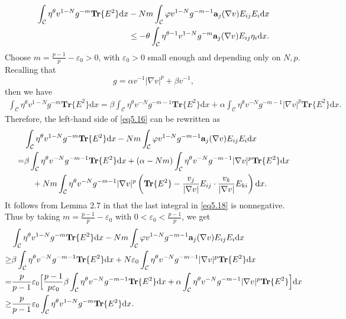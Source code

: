 \documentclass[12pt]{amsart}
\theoremstyle{definition}
\theoremstyle{remark}
\theoremstyle{conclusion}
\theoremstyle{conjecture}
\numberwithin{equation}{section}
\begin{document}
\begin{equation}\label{eq5.16}
\begin{split}
\int_{\mathcal{C}}\eta^\theta v^{1-N}g^{-m} \mathbf{Tr}\{E^2\}\mathrm{d}x &-Nm\int_{\mathcal{C}}\varphi v^{1-N}g^{-m-1}{\bf{a}}_j(\nabla v)E_{ij}E_i\mathrm{d}x\\
&\leq -\theta\int_{\mathcal{C}} \eta^{\theta-1} v^{1-N}g^{-m}{\bf{a}}_j(\nabla v)E_{ij}\eta_i \mathrm{d}x.
\end{split}
\end{equation}
Choose $m=\frac{p-1}{p}-\varepsilon_0>0$, with $\varepsilon_0>0$ small enough and depending only on $N,p$.
Recalling that
 $$g=\alpha v^{-1}|\nabla v|^p +\beta v^{-1},$$
 then we have
\begin{equation*}\label{eq5.17}
\begin{split}
\int_{\mathcal{C}}\eta^\theta v^{1-N}g^{-m} \mathbf{Tr}\{E^2\}\mathrm{d}x
        = \beta\int_{\mathcal{C}}\eta^\theta v^{-N}g^{-m-1}\mathbf{Tr}\{E^2\}\mathrm{d}x+\alpha\int_{\mathcal{C}}\eta^\theta v^{-N}g^{-m-1}|\nabla v|^p \mathbf{Tr}\{E^2\}\mathrm{d}x.
\end{split}
\end{equation*}
Therefore, the left-hand side of \eqref{eq5.16} can be rewritten as
\begin{equation}\label{eq5.18}
\begin{split}
\, &\int_{\mathcal{C}}\eta^\theta v^{1-N}g^{-m} \mathbf{Tr}\{E^2\}\mathrm{d}x-Nm\int_{\mathcal{C}}\varphi v^{1-N}g^{-m-1}{\bf{a}}_j(\nabla v)E_{ij}E_i\mathrm{d}x\\
 = & \beta\int_{\mathcal{C}}\eta^\theta v^{-N}g^{-m-1}\mathbf{Tr}\{E^2\}\mathrm{d}x+(\alpha-Nm)\int_{\mathcal{C}}\eta^\theta v^{-N}g^{-m-1}|\nabla v|^p \mathbf{Tr}\{E^2\}\mathrm{d}x\\
 \,&\quad +Nm\int_{\mathcal{C}}\eta^\theta v^{-N}g^{-m-1}|\nabla v|^p \left(\mathbf{Tr}\{E^2\}-\frac{v_{j}}{|\nabla v|}E_{ij}\cdot\frac{v_{k}}{|\nabla v|}E_{ki}\right)\mathrm{d}x .
\end{split}
\end{equation}
It follows from Lemma 2.7 in \cite{Ou} that the last integral in \eqref{eq5.18} is nonnegative. Thus by taking $m=\frac{p-1}{p}-\varepsilon_0$ with $0<\varepsilon_0<\frac{p-1}{p}$, we get
\begin{equation}\label{eq5.19}
\begin{split}
   \,&\int_{\mathcal{C}}\eta^\theta v^{1-N}g^{-m} \mathbf{Tr}\{E^2\}\mathrm{d}x-Nm\int_{\mathcal{C}}\varphi v^{1-N}g^{-m-1}{\bf{a}}_j(\nabla v)E_{ij}E_i\mathrm{d}x\\
\geq & \beta\int_{\mathcal{C}}\eta^\theta v^{-N}g^{-m-1}\mathbf{Tr}\{E^2\}\mathrm{d}x+N\varepsilon_0\int_{\mathcal{C}}\eta^\theta v^{-N}g^{-m-1}|\nabla v|^p \mathbf{Tr}\{E^2\}\mathrm{d}x\\
  =  & \frac{p}{p-1}\varepsilon_0\Big[\frac{p-1}{p\varepsilon_0}\beta\int_{\mathcal{C}}\eta^\theta v^{-N}g^{-m-1}\mathbf{Tr}\{E^2\}\mathrm{d}x+\alpha\int_{\mathcal{C}}\eta^\theta v^{-N}g^{-m-1}|\nabla v|^p \mathbf{Tr}\{E^2\}\Big]\mathrm{d}x\\
\geq & \frac{p}{p-1}\varepsilon_0\int_{\mathcal{C}}\eta^\theta v^{1-N}g^{-m} \mathbf{Tr}\{E^2\}\mathrm{d}x.
\end{split}
\end{equation}
\end{document}
